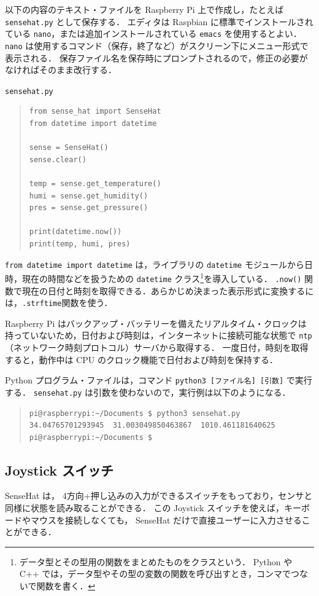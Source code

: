 \documentclass[11pt,a4,epsf]{report}
\begin{document}
以下の内容のテキスト・ファイルを Raspberry Pi 上で作成し，たとえば \verb+sensehat.py+ として保存する．
エディタは Raspbian に標準でインストールされている \verb+nano+，または追加インストールされている \verb+emacs+ を使用するとよい．
\verb+nano+ は使用するコマンド（保存，終了など）がスクリーン下にメニュー形式で表示される．
保存ファイル名を保存時にプロンプトされるので，修正の必要がなければそのまま改行する．
 \begin{itembox}[l]{\tt sensehat.py}
\begin{quote}
\small
\begin{verbatim}
from sense_hat import SenseHat
from datetime import datetime

sense = SenseHat()
sense.clear()

temp = sense.get_temperature()
humi = sense.get_humidity()
pres = sense.get_pressure()
    
print(datetime.now())
print(temp, humi, pres)
\end{verbatim}
\end{quote}
\end{itembox}
\verb+from datetime import datetime+ は，ライブラリの \verb+datetime+ モジュールから日時，現在の時間などを扱うための \verb+datetime+ クラス\footnote{データ型とその型用の関数をまとめたものをクラスという． Python や C++ では，データ型やその型の変数の関数を呼び出すとき，コンマでつないで関数を書く．}を導入している．
\verb+.now()+ 関数で現在の日付と時刻を取得できる．あらかじめ決まった表示形式に変換するには，\verb+.strftime+関数を使う．

Raspberry Pi はバックアップ・バッテリーを備えたリアルタイム・クロックは持っていないため，日付および時刻は，インターネットに接続可能な状態で \verb+ntp+ （ネットワーク時刻プロトコル）サーバから取得する．
一度日付，時刻を取得すると，動作中は CPU のクロック機能で日付および時刻を保持する．

Python プログラム・ファイルは，コマンド \verb+python3 [ファイル名] [引数]+ で実行する．
\verb+sensehat.py+ は引数を使わないので，実行例は以下のようになる．
\begin{quote}
\small
\begin{verbatim}
pi@raspberrypi:~/Documents $ python3 sensehat.py 
34.04765701293945  31.003049850463867  1010.461181640625 
pi@raspberrypi:~/Documents $ 
\end{verbatim}
\end{quote}

\subsection{Joystick スイッチ}
SenseHat は， 4方向+押し込みの入力ができるスイッチをもっており，センサと同様に状態を読み取ることができる．
この Joystick スイッチを使えば，キーボードやマウスを接続しなくても， SenseHat だけで直接ユーザーに入力させることができる．
\end{document}

